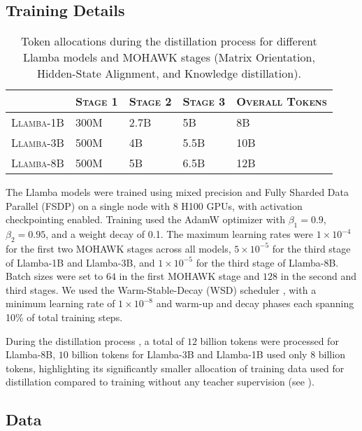 \subsection{Training Details}
\label{subsec:training_details}


\begin{table}[!t]
\centering
\begin{tabular}{@{}lllll@{}}
\toprule
  & \textsc{Stage 1} & \textsc{Stage 2} & \textsc{Stage 3} & \textsc{Overall Tokens} \\
  \midrule
\textsc{Llamba-1B} & 300M & 2.7B & 5B & 8B \\
\textsc{Llamba-3B} & 500M & 4B & 5.5B & 10B \\
\textsc{Llamba-8B} & 500M & 5B & 6.5B & 12B \\
\bottomrule
\end{tabular}
\caption{
Token allocations during the distillation process for different Llamba models and MOHAWK stages (Matrix Orientation, Hidden-State Alignment, and Knowledge distillation).
}
\label{tab:stages_tokens_budget}
\end{table}


The Llamba models were trained using mixed precision and Fully Sharded Data Parallel (FSDP) on a single node with 8 H100 GPUs, with activation checkpointing enabled.
Training used the AdamW optimizer with $\beta_1 = 0.9$, $\beta_2 = 0.95$, and a weight decay of 0.1. The maximum learning rates were $1 \times 10^{-4}$ for the first two MOHAWK stages across all models, $5 \times 10^{-5}$ for the third stage of Llamba-1B and Llamba-3B, and $1 \times 10^{-5}$ for the third stage of Llamba-8B. Batch sizes were set to $64$ in the first MOHAWK stage and $128$ in the second and third stages.
We used the Warm-Stable-Decay (WSD) scheduler \citep{minicpm}, with a minimum learning rate of $1 \times 10^{-8}$ and warm-up and decay phases each spanning 10\% of total training steps.

During the distillation process , a total of $12$ billion tokens were processed for Llamba-8B, $10$ billion tokens for Llamba-3B and Llamba-1B used only $8$ billion tokens, highlighting its significantly smaller allocation of training data used for distillation compared to training without any teacher supervision (see ).

\subsection{Data}
\label{mohawk:data}

